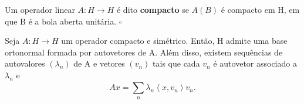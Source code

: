 \documentclass[measure_theory.tex]{subfiles}
\begin{document}
\begin{def*}
	Um operador linear \(A:H\rightarrow H\) é dito \textbf{compacto} se \(\overline{A(B)}\) é compacto em H, em que B é a bola aberta unitária. \(\square\)
\end{def*}
\begin{theorem*}
	Seja \(A:H\rightarrow H\) um operador compacto e simétrico. Então, H admite uma base ortonormal formada por autovetores de A. Além disso, existem sequências de autovalores \((\lambda_{n})\) de A e vetores \((v_{n})\) tais que
	cada \(v_{n}\) é autovetor associado a \(\lambda_{n}\) e
	\[
		Ax = \sum\limits_{n}^{}\lambda_{n} \left< x, v_{n} \right>v_{n}.
	\]
\end{theorem*}
\end{document}
